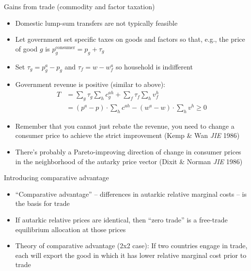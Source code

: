 \documentclass[11pt,notes=hide,aspectratio=169]{beamer}
\begin{document}
\begin{frame}{Gains from trade (commodity and factor taxation)}
\begin{itemize}
	\item Domestic lump-sum transfers are not typically feasible
	\item Let government set specific taxes on goods and factors so that, e.g., the price of good $g$ is $p_g^{\text{consumer}} = p_g + \tau_g$
	\item Set $\tau_g = p^a_g - p_g$ and $\tau_f = w - w^a_f$ so household is indifferent
	\item Government revenue is positive (similar to above):
	\begin{align*}
	T &= \sum\nolimits_g \tau_g \sum\nolimits_h c^{ah}_g + \sum\nolimits_f \tau_f \sum\nolimits_h v^h_f \\
	&= (p^a - p) \cdot \sum_h c^{ah} - (w^a - w) \cdot \sum_h v^h \geq 0
	\end{align*}
	\item Remember that you cannot just rebate the revenue, you need to change a consumer price to achieve the strict improvement (Kemp \& Wan \textit{JIE} 1986)
	\item There's probably a Pareto-improving direction of change in consumer prices in the neighborhood of the autarky price vector (Dixit \& Norman \textit{JIE} 1986)
\end{itemize}
\end{frame}
\begin{frame}{Introducing comparative advantage}
\begin{itemize}
	\item ``Comparative advantage'' -- differences in autarkic relative marginal costs -- is the basis for trade
	\item If autarkic relative prices are identical, then ``zero trade'' is a free-trade equilibrium allocation at those prices
	\item Theory of comparative advantage (2x2 case): If two countries engage in trade, each will export the good in which it has lower relative marginal cost prior to trade
\end{itemize}
\end{frame}
\end{document}
